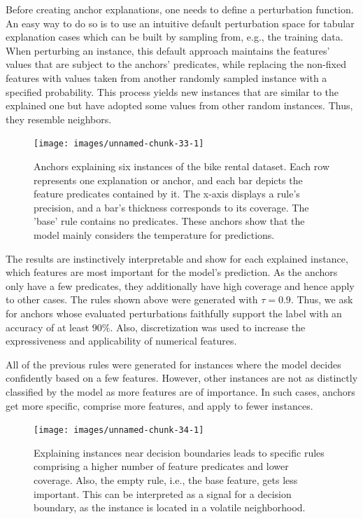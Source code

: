 \documentclass[
  12pt,
]{krantz}
\begin{document}
Before creating anchor explanations, one needs to define a perturbation function. An easy way to do so is to use an intuitive default perturbation space for tabular explanation cases which can be built by sampling from, e.g., the training data.
When perturbing an instance, this default approach maintains the features' values that are subject to the anchors' predicates, while replacing the non-fixed features with values taken from another randomly sampled instance with a specified probability. This process yields new instances that are similar to the explained one but have adopted some values from other random instances. Thus, they resemble neighbors.

\begin{figure}

{\centering \texttt{[image: images/unnamed-chunk-33-1]} 

}

\caption{Anchors explaining six instances of the bike rental dataset. Each row represents one explanation or anchor, and each bar depicts the feature predicates contained by it. The x-axis displays a rule's precision, and a bar's thickness corresponds to its coverage. The 'base' rule contains no predicates. These anchors show that the model mainly considers the temperature for predictions.}\label{fig:unnamed-chunk-33}
\end{figure}

The results are instinctively interpretable and show for each explained instance, which features are most important for the model's prediction. As the anchors only have a few predicates, they additionally have high coverage and hence apply to other cases.
The rules shown above were generated with \(\tau = 0.9\). Thus, we ask for anchors whose evaluated perturbations faithfully support the label with an accuracy of at least \(90\%\). Also, discretization was used to increase the expressiveness and applicability of numerical features.

All of the previous rules were generated for instances where the model decides confidently based on a few features. However, other instances are not as distinctly classified by the model as more features are of importance. In such cases, anchors get more specific, comprise more features, and apply to fewer instances.

\begin{figure}

{\centering \texttt{[image: images/unnamed-chunk-34-1]} 

}

\caption{Explaining instances near decision boundaries leads to specific rules comprising a higher number of feature predicates and lower coverage. Also, the empty rule, i.e., the base feature, gets less important. This can be interpreted as a signal for a decision boundary, as the instance is located in a volatile neighborhood.}\label{fig:unnamed-chunk-34}
\end{figure}
\end{document}

